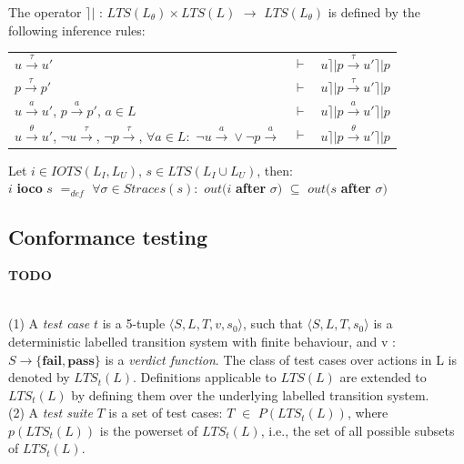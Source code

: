\documentclass[a4paper]{report}
\begin{document}
\begin{definition}
The operator $ \rceil \vert $ : $LTS(L_{\theta}) \times LTS(L)$ $\rightarrow $ $ LTS(L_{\theta}) $ is defined by the following inference rules:\\

\begin{tabular}{lll}
   $u \xrightarrow{\tau} u'$ & $\vdash$ & $u \rceil \vert p \xrightarrow{\tau} u' \rceil \vert p$ \\
   $p \xrightarrow{\tau} p'$ & $\vdash$ & $u \rceil \vert p \xrightarrow{\tau} u' \rceil \vert p$ \\
   $u \xrightarrow{a} u'$, $p \xrightarrow{a} p'$, $a\in L$ & $\vdash$ & $u \rceil \vert p \xrightarrow{a} u' \rceil \vert p$ \\
   $u \xrightarrow{\theta} u'$, $\neg u \xrightarrow{\tau}$, $\neg p \xrightarrow{\tau}$, $\forall a \in L :$ $\neg u \xrightarrow{a} \vee \neg p \xrightarrow{a}$ & $\vdash$ & $u \rceil \vert p \xrightarrow{\theta} u' \rceil \vert p$ \\


\end{tabular}

\end{definition}

Let $i \in IOTS(L_I, L_U)$, $s \in LTS(L_I \cup L_U)$, then:\\
$i$ \textbf{ioco} $s$ $=_{def}$ $ \forall \sigma \in Straces(s): $ $out(i$ \textbf{after} $\sigma) $ $\subseteq$ $out(s$ \textbf{after} $\sigma) $\\




\subsection*{Conformance testing}
{\color{red} \textbf{TODO}}\\

\begin{definition}{$ $\\}
(1) A \textit{test case} $t$ is a 5-tuple $\langle S, L, T, v, s_0 \rangle$, such that $\langle S, L, T, s_0 \rangle$ is a deterministic labelled transition system with finite behaviour, and v : $S \rightarrow \{\textbf{fail}, \textbf{pass} \}$ is a \textit{verdict function}.
The class of test cases over actions in L is denoted by $LTS_t (L)$. Definitions applicable to $LTS(L)$ are extended to $LTS_t (L)$ by defining them over the underlying labelled transition system.\\
\newline
(2) A \textit{test suite} $T$ is a set of test cases: $T$ $\in$ $P(LTS_t (L))$, where $p(LTS_t (L))$ is the powerset of $LTS_t (L)$, i.e., the set of all possible subsets of $LTS_t (L)$.
\end{definition}
\end{document}
